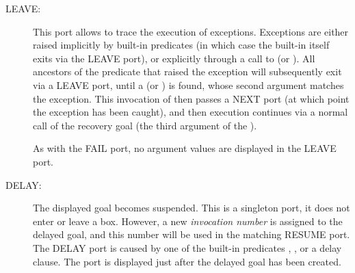 \begin{description}
\item[LEAVE:]
This port allows to trace the execution of exceptions.  Exceptions
are either raised implicitly by built-in predicates (in which case the
built-in itself exits via the LEAVE port), or explicitly through a call to
(or ).
All ancestors of the predicate that raised the exception will subsequently
exit via a LEAVE port, until a
(or )
is found, whose second argument matches the exception.
This invocation of
then passes a NEXT port (at which point the exception has been caught),
and then execution continues via a normal call of the recovery goal
(the third argument of the
).

As with the FAIL port, no argument values are displayed in the LEAVE port.

%
%

\item[DELAY:]
The displayed goal becomes suspended. This is a singleton port, it does
not enter or leave a box. However, a new \emph{invocation number} is assigned
to the delayed goal, and this number will be used in the matching RESUME port.
The DELAY port is caused by one of the built-in predicates
,
,
or a delay clause.
The port is displayed just after the delayed goal has been created.


\end{description}
